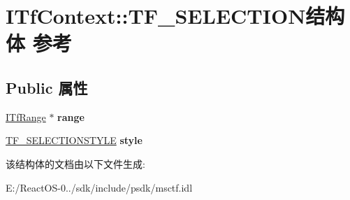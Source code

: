 \hypertarget{struct_i_tf_context_1_1_t_f___s_e_l_e_c_t_i_o_n}{}\section{I\+Tf\+Context\+:\+:T\+F\+\_\+\+S\+E\+L\+E\+C\+T\+I\+O\+N结构体 参考}
\label{struct_i_tf_context_1_1_t_f___s_e_l_e_c_t_i_o_n}
\subsection*{Public 属性}
\begin{DoxyCompactItemize}
\item 
\mbox{\label{struct_i_tf_context_1_1_t_f___s_e_l_e_c_t_i_o_n_a97cf0d1a9e076751ed36da2d51381b13}} 
\hyperlink{interface_i_tf_range}{I\+Tf\+Range} $\ast$ {\bfseries range}
\item 
\mbox{\label{struct_i_tf_context_1_1_t_f___s_e_l_e_c_t_i_o_n_a2e960de2a7f8016820520887c0d74190}} 
\hyperlink{struct_i_tf_context_1_1_t_f___s_e_l_e_c_t_i_o_n_s_t_y_l_e}{T\+F\+\_\+\+S\+E\+L\+E\+C\+T\+I\+O\+N\+S\+T\+Y\+LE} {\bfseries style}
\end{DoxyCompactItemize}


该结构体的文档由以下文件生成\+:\begin{DoxyCompactItemize}
\item 
E\+:/\+React\+O\+S-\/0../sdk/include/psdk/msctf.\+idl\end{DoxyCompactItemize}
